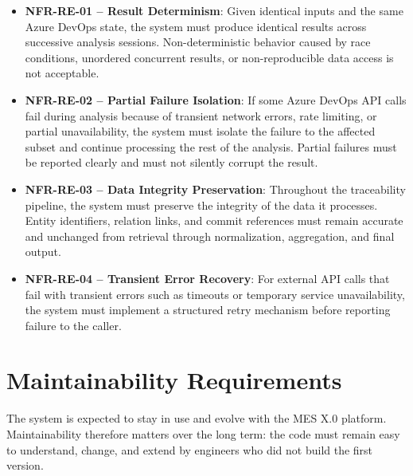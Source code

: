 \begin{itemize}
  \item \textbf{NFR-RE-01 -- Result Determinism}: Given identical inputs and the same Azure DevOps state, the system must produce identical results across successive analysis sessions. Non-deterministic behavior caused by race conditions, unordered concurrent results, or non-reproducible data access is not acceptable.

  \item \textbf{NFR-RE-02 -- Partial Failure Isolation}: If some Azure DevOps API calls fail during analysis because of transient network errors, rate limiting, or partial unavailability, the system must isolate the failure to the affected subset and continue processing the rest of the analysis. Partial failures must be reported clearly and must not silently corrupt the result.

  \item \textbf{NFR-RE-03 -- Data Integrity Preservation}: Throughout the traceability pipeline, the system must preserve the integrity of the data it processes. Entity identifiers, relation links, and commit references must remain accurate and unchanged from retrieval through normalization, aggregation, and final output.

  \item \textbf{NFR-RE-04 -- Transient Error Recovery}: For external API calls that fail with transient errors such as timeouts or temporary service unavailability, the system must implement a structured retry mechanism before reporting failure to the caller.
\end{itemize}

\section{Maintainability Requirements}
\label{sec:req-maintainability}

The system is expected to stay in use and evolve with the MES X.0 platform.
Maintainability therefore matters over the long term: the code must remain easy
to understand, change, and extend by engineers who did not build the first
version.

